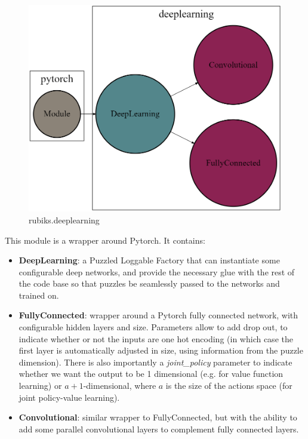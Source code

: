 \begin{figure}[H]
\centering
\includegraphics[scale=0.22]{./Figures/codebasedeeplearning}
\caption[Codebase]{rubiks.deeplearning}
\label{fig:Codebasedeeplearning}
\end{figure}
This module is a wrapper around Pytorch. It contains:
\begin{itemize}
\item \textbf{DeepLearning}: a Puzzled Loggable Factory that can instantiate some configurable deep networks, and provide the necessary glue with the rest of the code base so that puzzles be seamlessly passed to the networks and trained on. 
\item \textbf{FullyConnected}: wrapper around a Pytorch fully connected network, with configurable hidden layers and size. Parameters allow to add drop out, to indicate whether or not the inputs are one hot encoding (in which case the first layer is automatically adjusted in size, using information from the puzzle dimension). There is also importantly a \textit{joint\_policy} parameter to indicate whether we want the output to be 1 dimensional (e.g. for value function learning) or $a+1$-dimensional, where $a$ is the size of the actions space (for joint policy-value learning).
\item \textbf{Convolutional}: similar wrapper to FullyConnected, but with the ability to add some parallel convolutional layers to complement fully connected layers.
\end{itemize}


